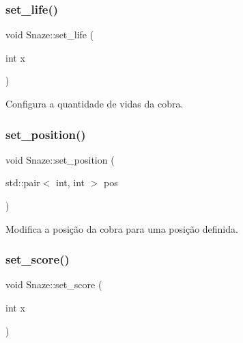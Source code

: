 \mbox{\label{classSnaze_a937b8d382ef2babd14ac37f1e2831be8}} 
\subsubsection{\texorpdfstring{set\+\_\+life()}{set\_life()}}
{\footnotesize\ttfamily void Snaze\+::set\+\_\+life (\begin{DoxyParamCaption}\item[{int}]{x }\end{DoxyParamCaption})\hspace{0.3cm}{\ttfamily [inline]}}



Configura a quantidade de vidas da cobra. 

\mbox{\label{classSnaze_aa044b29757e0177ec1b386ca4765d3fa}} 
\subsubsection{\texorpdfstring{set\+\_\+position()}{set\_position()}}
{\footnotesize\ttfamily void Snaze\+::set\+\_\+position (\begin{DoxyParamCaption}\item[{std\+::pair$<$ int, int $>$}]{pos }\end{DoxyParamCaption})\hspace{0.3cm}{\ttfamily [inline]}}



Modifica a posição da cobra para uma posição definida. 

\mbox{\label{classSnaze_a437fb5a032ce59212b62bf484e208d0d}} 
\subsubsection{\texorpdfstring{set\+\_\+score()}{set\_score()}}
{\footnotesize\ttfamily void Snaze\+::set\+\_\+score (\begin{DoxyParamCaption}\item[{int}]{x }\end{DoxyParamCaption})\hspace{0.3cm}{\ttfamily [inline]}}



